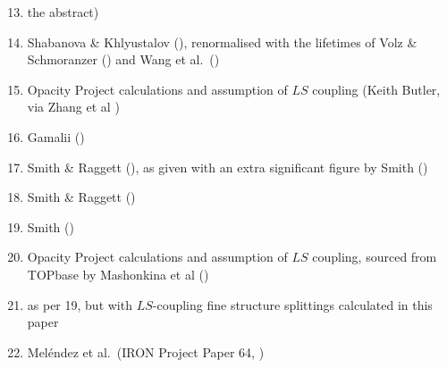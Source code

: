 \documentclass[traditabstract]{aa}
\begin{document}
\begin{minipage}[t]{0.43\linewidth}
\vspace{0pt}
\begin{enumerate}
\setcounter{enumi}{12}
\item[] the abstract)
\item Shabanova \& Khlyustalov (\cite{Shabanova85}), renormalised with the lifetimes of Volz \& Schmoranzer (\cite{Volz96}) and Wang et al.\ (\cite{Wang97})
\item Opacity Project calculations and assumption of $LS$ coupling (Keith Butler, via Zhang et al \cite{zhan})
\item Gamalii (\cite{Gamalii97})
\item Smith \& Raggett (\cite{smit}), as given with an extra significant figure by Smith (\cite{Smith81})
\item Smith \& Raggett (\cite{smit})
\item Smith (\cite{Smith88})
\item Opacity Project calculations and assumption of $LS$ coupling, sourced from TOPbase by Mashonkina et al (\cite{mash1})
\item as per 19, but with $LS$-coupling fine structure splittings calculated in this paper
\item Mel\'endez et al.\ (IRON Project Paper 64, \cite{melen})
\end{enumerate}
\end{minipage}
\vspace{6mm}
\end{document}
